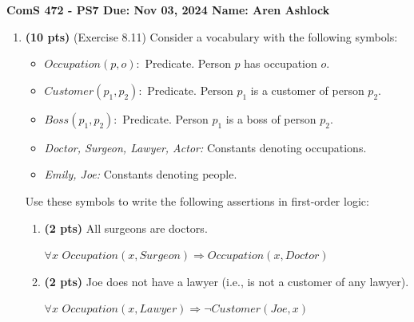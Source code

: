 \documentclass{article}
\begin{document}
\noindent\textbf{ComS 472 - PS7 \quad Due: Nov 03, 2024 \quad Name: Aren Ashlock}

\begin{enumerate}


\item \textbf{(10 pts)} (Exercise 8.11) Consider a vocabulary with the following symbols:

\begin{itemize}
    \item $Occupation(p, o):$ Predicate. Person $p$ has occupation $o$.
    \item $Customer(p_1, p_2):$ Predicate. Person $p_1$ is a customer of person $p_2$.
    \item $Boss(p_1, p_2):$ Predicate. Person $p_1$ is a boss of person $p_2$.
    \item \textit{Doctor, Surgeon, Lawyer, Actor:} Constants denoting occupations.
    \item \textit{Emily, Joe:} Constants denoting people.
\end{itemize}

Use these symbols to write the following assertions in first-order logic:

    \begin{enumerate}[label=($\alph*$)]


    \addtocounter{enumii}{2} \item \textbf{(2 pts)} All surgeons are doctors.

    \color{blue}
        $\forall x$ $Occupation(x, Surgeon) \Rightarrow Occupation(x, Doctor)$
    \color{black}



    \item \textbf{(2 pts)} Joe does not have a lawyer (i.e., is not a customer of any lawyer).

    \color{blue}
        $\forall x$ $Occupation(x, Lawyer) \Rightarrow \neg Customer(Joe, x)$
    \color{black}



\end{enumerate}
\end{enumerate}
\end{document}
